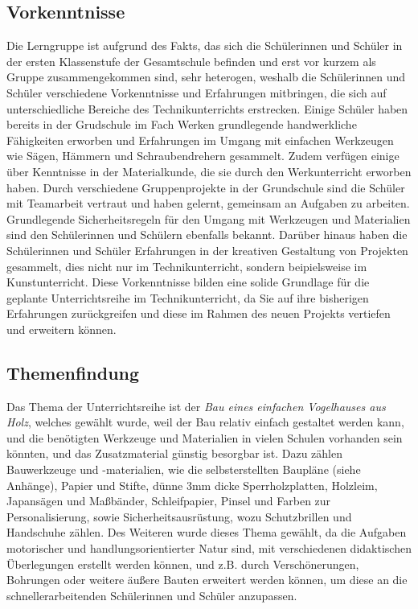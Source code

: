 \documentclass[12pt]{article}
\begin{document}
\subsection{Vorkenntnisse}
Die Lerngruppe ist aufgrund des Fakts, das sich die Schülerinnen und Schüler in der ersten Klassenstufe der Gesamtschule befinden und erst vor kurzem als Gruppe zusammengekommen sind, sehr heterogen, weshalb die Schülerinnen und Schüler verschiedene Vorkenntnisse und Erfahrungen mitbringen, die sich auf unterschiedliche Bereiche des Technikunterrichts erstrecken. Einige Schüler haben bereits in der Grudschule im Fach Werken grundlegende handwerkliche Fähigkeiten erworben und Erfahrungen im Umgang mit einfachen Werkzeugen wie Sägen, Hämmern und Schraubendrehern gesammelt. Zudem verfügen einige über Kenntnisse in der Materialkunde, die sie durch den Werkunterricht erworben haben. Durch verschiedene Gruppenprojekte in der Grundschule sind die Schüler mit Teamarbeit vertraut und haben gelernt, gemeinsam an Aufgaben zu arbeiten. Grundlegende Sicherheitsregeln für den Umgang mit Werkzeugen und Materialien sind den Schülerinnen und Schülern ebenfalls bekannt. Darüber hinaus haben die Schülerinnen und Schüler Erfahrungen in der kreativen Gestaltung von Projekten gesammelt, dies nicht nur im Technikunterricht, sondern beipielsweise im Kunstunterricht. Diese Vorkenntnisse bilden eine solide Grundlage für die geplante Unterrichtsreihe im Technikunterricht, da Sie auf ihre bisherigen Erfahrungen zurückgreifen und diese im Rahmen des neuen Projekts vertiefen und erweitern können.

\subsection{Themenfindung}
Das Thema der Unterrichtsreihe ist der \textit{Bau eines einfachen Vogelhauses aus Holz}, welches gewählt wurde, weil der Bau relativ einfach gestaltet werden kann, und die benötigten Werkzeuge und Materialien in vielen Schulen vorhanden sein könnten, und das Zusatzmaterial günstig besorgbar ist. Dazu zählen Bauwerkzeuge und -materialien, wie die selbsterstellten Baupläne (siehe Anhänge), Papier und Stifte, dünne 3mm dicke Sperrholzplatten, Holzleim, Japansägen und Maßbänder, Schleifpapier, Pinsel und Farben zur Personalisierung, sowie Sicherheitsausrüstung, wozu Schutzbrillen und Handschuhe zählen. Des Weiteren wurde dieses Thema gewählt, da die Aufgaben motorischer und handlungsorientierter Natur sind, mit verschiedenen didaktischen Überlegungen erstellt werden können, und z.B. durch Verschönerungen, Bohrungen oder weitere äußere Bauten erweitert werden können, um diese an die schnellerarbeitenden Schülerinnen und Schüler anzupassen.
\end{document}
